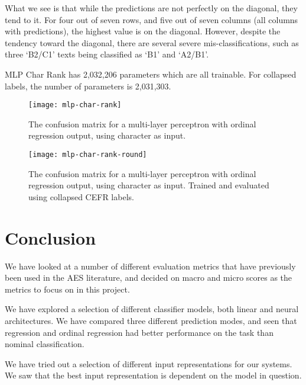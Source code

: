What we see is that while the predictions are not perfectly on the diagonal,
they tend to it. For four out of seven rows, and five out of seven columns
(all columns with predictions), the highest value is on the diagonal.
However, despite the tendency toward the diagonal, there are several severe
mis-classifications, such as three `B2/C1' texts being classified as `B1' and
`A2/B1'.

MLP Char Rank has 2,032,206 parameters which are all trainable. For collapsed
labels, the number of parameters is 2,031,303.

\begin{figure}
  \centering
  \texttt{[image: mlp-char-rank]}
  \caption[Confusion matrix for MLP Rank Char]{
    The confusion matrix for a multi-layer perceptron with ordinal regression
    output, using character \ngrams as input.
  }
  \label{fig:mlp-char-rank}
\end{figure}

\begin{figure}
  \centering
  \texttt{[image: mlp-char-rank-round]}
  \caption[Confusion matrix for MLP Rank Char, collapsed labels]{
    The confusion matrix for a multi-layer perceptron with ordinal regression
    output, using character \ngrams as input. Trained and evaluated using
    collapsed CEFR labels.
  }
  \label{fig:mlp-char-rank-round}
\end{figure}


\section{Conclusion}

We have looked at a number of different evaluation metrics that have
previously been used in the \ac{AES} literature, and decided on macro and
micro \FI scores as the metrics to focus on in this project.

We have explored a selection of different classifier models, both linear and
neural architectures. We have compared three different prediction modes, and
seen that regression and ordinal regression had better performance on the
task than nominal classification.

We have tried out a selection of different input representations for our
systems. We saw that the best input representation is dependent on the model
in question.
